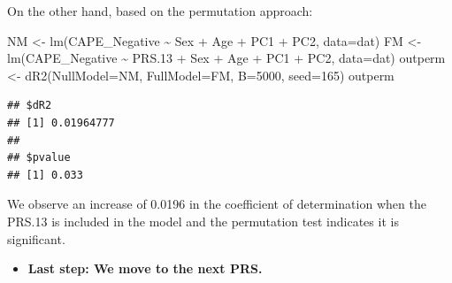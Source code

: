 \documentclass[
]{article}
\newenvironment{Shaded}{\begin{snugshade}}{\end{snugshade}}
\newcommand{\AttributeTok}[1]{\textcolor[rgb]{0.77,0.63,0.00}{#1}}
\newcommand{\DecValTok}[1]{\textcolor[rgb]{0.00,0.00,0.81}{#1}}
\newcommand{\FloatTok}[1]{\textcolor[rgb]{0.00,0.00,0.81}{#1}}
\newcommand{\FunctionTok}[1]{\textcolor[rgb]{0.00,0.00,0.00}{#1}}
\newcommand{\NormalTok}[1]{#1}
\newcommand{\OtherTok}[1]{\textcolor[rgb]{0.56,0.35,0.01}{#1}}
\newcommand{\SpecialCharTok}[1]{\textcolor[rgb]{0.00,0.00,0.00}{#1}}
\providecommand{\tightlist}{%
  \setlength{\itemsep}{0pt}\setlength{\parskip}{0pt}}
\begin{document}
On the other hand, based on the permutation approach:

\begin{Shaded}
\begin{Highlighting}[]
\NormalTok{NM }\OtherTok{\textless{}{-}} \FunctionTok{lm}\NormalTok{(CAPE\_Negative }\SpecialCharTok{\textasciitilde{}}\NormalTok{  Sex }\SpecialCharTok{+}\NormalTok{ Age }\SpecialCharTok{+}\NormalTok{ PC1 }\SpecialCharTok{+}\NormalTok{ PC2, }\AttributeTok{data=}\NormalTok{dat)}
\NormalTok{FM }\OtherTok{\textless{}{-}} \FunctionTok{lm}\NormalTok{(CAPE\_Negative }\SpecialCharTok{\textasciitilde{}}\NormalTok{ PRS}\FloatTok{.13} \SpecialCharTok{+}\NormalTok{ Sex }\SpecialCharTok{+}\NormalTok{ Age }\SpecialCharTok{+}\NormalTok{ PC1 }\SpecialCharTok{+}\NormalTok{ PC2, }\AttributeTok{data=}\NormalTok{dat)}
\NormalTok{outperm }\OtherTok{\textless{}{-}} \FunctionTok{dR2}\NormalTok{(}\AttributeTok{NullModel=}\NormalTok{NM, }\AttributeTok{FullModel=}\NormalTok{FM, }\AttributeTok{B=}\DecValTok{5000}\NormalTok{, }\AttributeTok{seed=}\DecValTok{165}\NormalTok{)}
\NormalTok{outperm}
\end{Highlighting}
\end{Shaded}

\begin{verbatim}
## $dR2
## [1] 0.01964777
## 
## $pvalue
## [1] 0.033
\end{verbatim}

We observe an increase of 0.0196 in the coefficient of determination
when the PRS.13 is included in the model and the permutation test
indicates it is significant.

\begin{itemize}
\tightlist
\item
  \textbf{Last step: We move to the next PRS.}
\end{itemize}
\end{document}
